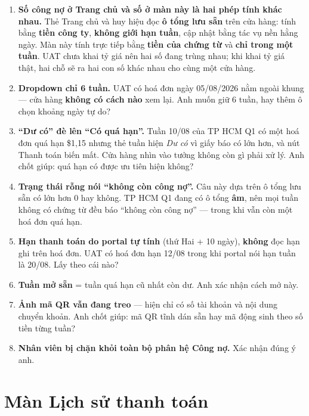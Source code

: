 \begin{ask}
\begin{enumerate}[leftmargin=*]
  \item \textbf{Số công nợ ở Trang chủ và số ở màn này là hai phép tính khác nhau.} Thẻ Trang
        chủ và huy hiệu đọc \textbf{ô tổng lưu sẵn} trên cửa hàng: tính bằng \textbf{tiền công
        ty}, \textbf{không giới hạn tuần}, cập nhật bằng tác vụ nền hằng ngày. Màn này tính
        trực tiếp bằng \textbf{tiền của chứng từ} và \textbf{chỉ trong một tuần}. UAT chưa khai
        tỷ giá nên hai số đang trùng nhau; khi khai tỷ giá thật, hai chỗ sẽ ra hai con số khác
        nhau cho cùng một cửa hàng.
  \item \textbf{Dropdown chỉ 6 tuần.} UAT có  hoá đơn ngày 05/08/2026 nằm ngoài khung
        --- cửa hàng \textbf{không có cách nào} xem lại. Anh muốn giữ 6 tuần, hay thêm ô chọn
        khoảng ngày tự do?
  \item \textbf{``Dư có'' đè lên ``Có quá hạn''.} Tuần 10/08 của TP HCM Q1 có một hoá đơn quá
        hạn \$1,15 nhưng thẻ tuần hiện \emph{Dư có} vì giấy báo có lớn hơn, và nút Thanh toán
        biến mất. Cửa hàng nhìn vào tưởng không còn gì phải xử lý. Anh chốt giúp: quá hạn có
        được ưu tiên hiện không?
  \item \textbf{Trạng thái rỗng nói ``không còn công nợ''.} Câu này dựa trên ô tổng lưu sẵn có
        lớn hơn 0 hay không. TP HCM Q1 đang có ô tổng \textbf{âm}, nên mọi tuần không có chứng
        từ đều báo ``không còn công nợ'' --- trong khi vẫn còn một hoá đơn quá hạn.
  \item \textbf{Hạn thanh toán do portal tự tính} (thứ Hai + 10 ngày), \textbf{không} đọc hạn
        ghi trên hoá đơn. UAT có hoá đơn hạn 12/08 trong khi portal nói hạn tuần là 20/08.
        Lấy theo cái nào?
  \item \textbf{Tuần mở sẵn} = tuần quá hạn cũ nhất còn dư. Anh xác nhận cách mở này.
  \item \textbf{Ảnh mã QR vẫn đang treo} --- hiện chỉ có số tài khoản và nội dung chuyển khoản.
        Anh chốt giúp: mã QR tĩnh dán sẵn hay mã động sinh theo số tiền từng tuần?
  \item \textbf{Nhân viên bị chặn khỏi toàn bộ phân hệ Công nợ.} Xác nhận đúng ý anh.
\end{enumerate}
\end{ask}

\section{Màn Lịch sử thanh toán}
\medskip

